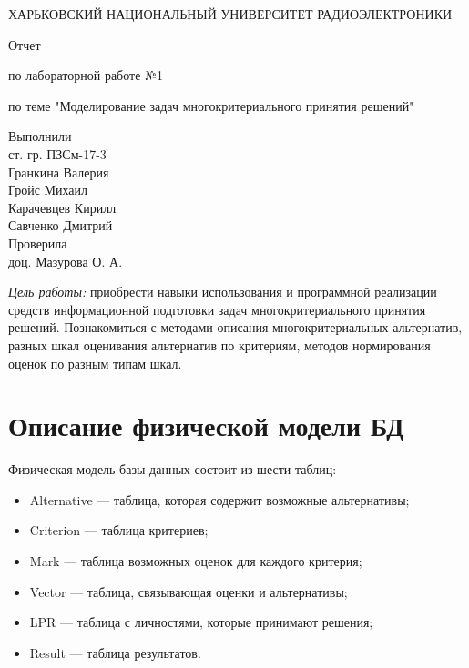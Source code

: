 \documentclass[titlepage]{article}
\newcommand{\goal}[1]{\textit{Цель работы:} #1}
\begin{document}
\begin{titlepage}
\begin{center}
\MakeUppercase{Харьковский национальный университет радиоэлектроники}

\vspace*{\fill}
Отчет

по лабораторной работе №1

по теме "Моделирование задач многокритериального принятия решений"

\end{center}
\vspace{20mm}
\hfill
\begin{varwidth}{\linewidth}
Выполнили\\
ст. гр. ПЗСм-17-3\\
Гранкина Валерия\\
Гройс Михаил\\
Карачевцев Кирилл\\
Савченко Дмитрий\\

Проверила\\
доц. Мазурова О. А.
\end{varwidth}
\vspace*{\fill}

\end{titlepage}
\goal{приобрести навыки использования и программной реализации средств информационной подготовки задач многокритериального принятия решений. Познакомиться с методами описания многокритериальных альтернатив, разных шкал оценивания альтернатив по критериям, методов нормирования оценок по разным типам шкал.}
\section*{Описание физической модели БД}
Физическая модель базы данных состоит из шести таблиц:
\begin{itemize}
\item Alternative --- таблица, которая содержит возможные альтернативы;
\item Criterion --- таблица критериев;
\item Mark --- таблица возможных оценок для каждого критерия;
\item Vector --- таблица, связывающая оценки и альтернативы;
\item LPR --- таблица с личностями, которые принимают решения;
\item Result --- таблица результатов.
\end{itemize}
\end{document}
